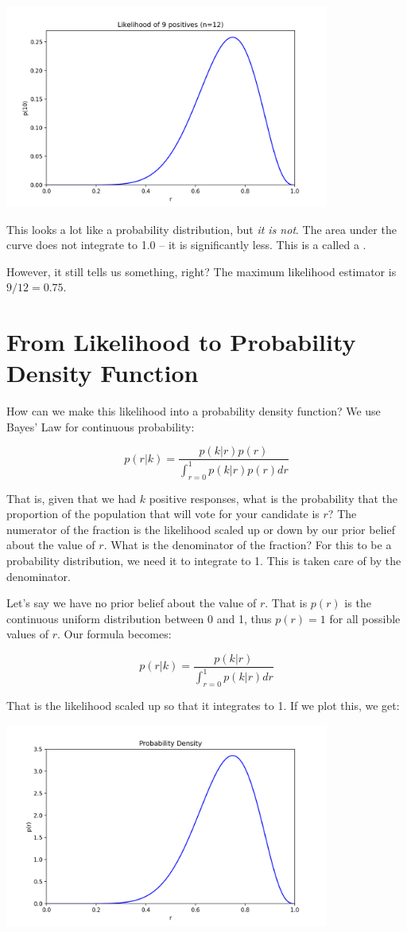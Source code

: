 \includegraphics[width=0.8\textwidth]{likelihood.png}

This looks a lot like a probability distribution, but \emph{it is not}.  The area under the curve does not integrate to 1.0 -- it is significantly less.  This is a called a .

However,  it still tells us something, right?  The maximum likelihood estimator is $9/12 = 0.75$.

\section{From Likelihood to Probability Density Function}

How can we make this likelihood into a probability density function?  We use Bayes' Law for continuous probability:

$$p(r|k)  = \frac{p(k | r) p(r)}{\int_{r = 0}^{1} p(k | r) p(r) dr}$$

That is,  given that we had $k$ positive responses,  what is the probability that the proportion of the population that will vote for your candidate is $r$?   The numerator of the fraction is the likelihood scaled up or down by our prior belief about the value of $r$.    What is the denominator of the fraction?  For this to be a probability distribution,  we need it to integrate to 1.  This is taken care of by the denominator.

Let's say we have no prior belief about the value of $r$.   That is $p(r)$ is the continuous uniform distribution between 0 and 1, thus $p(r) = 1$ for all possible values of $r$.  Our formula becomes:

$$p(r|k)  = \frac{p(k | r)}{\int_{r = 0}^{1} p(k | r) dr}$$

That is the likelihood scaled up so that it integrates to 1.  If we plot this, we get:

\includegraphics[width=0.8\textwidth]{bayes.png}

